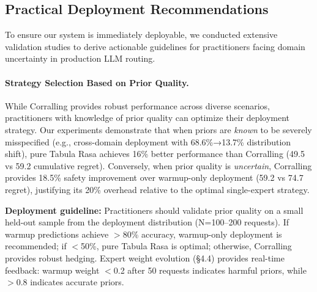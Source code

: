 
\subsection{Practical Deployment Recommendations}
\label{sec:practical}

To ensure our system is immediately deployable, we conducted extensive validation studies to derive actionable guidelines for practitioners facing domain uncertainty in production LLM routing.

\paragraph{Strategy Selection Based on Prior Quality.}
While Corralling provides robust performance across diverse scenarios, practitioners with knowledge of prior quality can optimize their deployment strategy.
Our experiments demonstrate that when priors are \emph{known} to be severely misspecified (e.g., cross-domain deployment with 68.6\%→13.7\% distribution shift), pure Tabula Rasa achieves 16\% better performance than Corralling (49.5 vs 59.2 cumulative regret).
Conversely, when prior quality is \emph{uncertain}, Corralling provides 18.5\% safety improvement over warmup-only deployment (59.2 vs 74.7 regret), justifying its 20\% overhead relative to the optimal single-expert strategy.

\textbf{Deployment guideline:}
Practitioners should validate prior quality on a small held-out sample from the deployment distribution (N=100--200 requests).
If warmup predictions achieve $>$80\% accuracy, warmup-only deployment is recommended; if $<$50\%, pure Tabula Rasa is optimal; otherwise, Corralling provides robust hedging.
Expert weight evolution (§4.4) provides real-time feedback: warmup weight $<$0.2 after 50 requests indicates harmful priors, while $>$0.8 indicates accurate priors.

